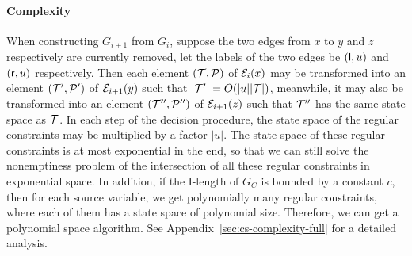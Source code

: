 \paragraph*{Complexity}
When constructing $G_{i+1}$ from $G_i$, suppose the two edges from $x$ to $y$ and $z$ respectively are currently removed, let the labels of the two edges be $({\sf l}, u)$ and $({\sf r}, u)$ respectively. Then each element $(\mathcal{T}, \mathcal{P})$ of $\mathcal{E}_i(x)$ may be transformed into an element $(\mathcal{T}', \mathcal{P}')$ of $\mathcal{E}_{i+1}(y)$ such that $|\mathcal{T}'| = O(|u||\mathcal{T}|)$, meanwhile, it may also be transformed into an element $(\mathcal{T}'', \mathcal{P}'')$ of $\mathcal{E}_{i+1}(z)$ such that $\mathcal{T}''$ has the same state space as $\mathcal{T}$. In each step of the decision procedure, the state space of the regular constraints may be multiplied by a factor $|u|$. The state space of these regular constraints is at most exponential in the end, so that we can still solve the nonemptiness problem of the intersection of all these regular constraints in exponential space. In addition, if the $\mathsf{l}$-length of $G_C$ is bounded by a constant $c$, then for each source variable, we get polynomially many regular constraints, where each of them has a state space of polynomial size. Therefore, we can get a polynomial space algorithm. See Appendix~\ref{sec:cs-complexity-full} for a detailed analysis.


